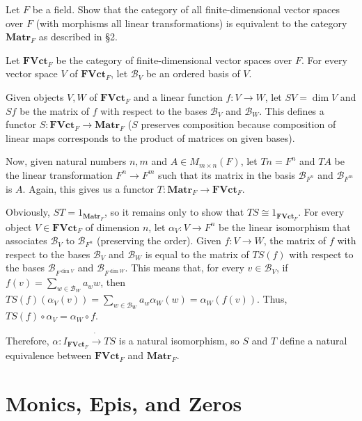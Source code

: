 \begin{exercise}
Let $F$ be a field. Show that the category of all finite-dimensional vector spaces over $F$ (with morphisms all linear transformations) is equivalent to the category $\mathbf{Matr}_F$ as described in \S 2.
\end{exercise}
\begin{solution}
Let $\mathbf{FVct}_F$ be the category of finite-dimensional vector spaces over $F$. For every vector space $V$ of $\mathbf{FVct}_F$, let $\mathscr{B}_V$ be an ordered basis of $V$.

Given objects $V,W$ of $\mathbf{FVct}_F$ and a linear function $f:V\to W$, let $SV=\dim V$ and $Sf$ be the matrix of $f$ with respect to the bases $\mathscr{B}_V$ and $\mathscr{B}_{W}$. This defines a functor $S:\mathbf{FVct}_F\to\mathbf{Matr}_F$ ($S$ preserves composition because composition of linear maps corresponds to the product of matrices on given bases).

Now, given natural numbers $n,m$ and $A\in M_{m\times n}(F)$, let $Tn=F^n$ and $TA$ be the linear transformation $F^n\to F^m$ such that its matrix in the basis $\mathscr{B}_{F^n}$ and $\mathscr{B}_{F^m}$ is $A$. Again, this gives us a functor $T:\mathbf{Matr}_F\to\mathbf{FVct}_F$.

Obviously, $ST=1_{\mathbf{Matr}_F}$, so it remains only to show that $TS\cong 1_{\mathbf{FVct}_F}$. For every object $V\in\mathbf{FVct}_F$ of dimension $n$, let $\alpha_V:V\to F^n$ be the linear isomorphism that associates $\mathscr{B}_V$ to $\mathscr{B}_{F^n}$ (preserving the order). Given $f:V\to W$, the matrix of $f$ with respect to the bases $\mathscr{B}_V$ and $\mathscr{B}_W$ is equal to the matrix of $TS(f)$ with respect to the bases $\mathscr{B}_{F^{\dim V}}$ and $\mathscr{B}_{F^{\dim W}}$. This means that, for every $v\in\mathscr{B}_V$, if $f(v)=\sum_{w\in\mathscr{B}_W}a_w w$, then $TS(f)(\alpha_V(v))=\sum_{w\in\mathscr{B}_W}a_w\alpha_W(w)=\alpha_W(f(v))$. Thus, $TS(f)\circ\alpha_V=\alpha_W\circ f$.

Therefore, $\alpha\colon I_{\mathbf{FVct}_F}\dot{\to} TS$ is a natural isomorphism, so $S$ and $T$ define a natural equivalence between $\mathbf{FVct}_F$ and $\mathbf{Matr}_F$.
\end{solution}

\section{Monics, Epis, and Zeros}

